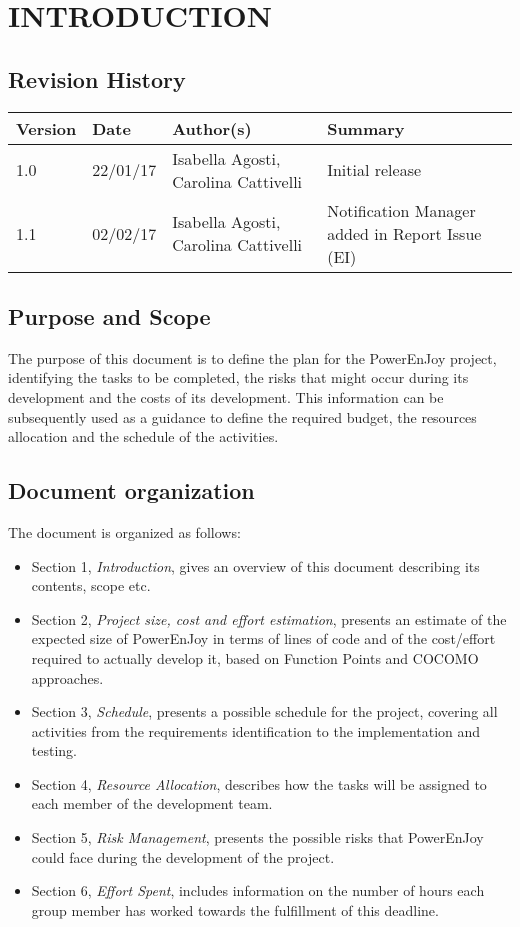 \section{INTRODUCTION}

\subsection{Revision History}
\begin{table}[h]
	\centering
	\begin{tabular}{| m{1.5cm} | m{1.6cm} | m{5cm} | m{3.9cm} |}
		\hline
		\textbf{Version} & \textbf{Date} & \textbf{Author(s)} & \textbf{Summary}\\
		\hline
		1.0 & 22/01/17 & Isabella Agosti, Carolina Cattivelli & Initial release\\
		\hline
		1.1 & 02/02/17 & Isabella Agosti, Carolina Cattivelli & Notification Manager added in Report Issue (EI)\\
		\hline
	\end{tabular}
\end{table}

\subsection{Purpose and Scope}
The purpose of this document is to define the plan for the PowerEnJoy project, identifying the tasks to be completed, the risks that might occur during its development and the costs of its development. This information can be subsequently used as a guidance to define the required budget, the resources allocation and the schedule of the activities.

\subsection{Document organization}
The document is organized as follows:
\begin{itemize}
	\item Section 1, \textit{Introduction}, gives an overview of this document describing its contents, scope etc.
	\item Section 2, \textit{Project size, cost and effort estimation}, presents an estimate of the expected size of PowerEnJoy in terms of lines of code and of the cost/effort required to actually develop it, based on Function Points and COCOMO approaches.
	\item Section 3, \textit{Schedule}, presents a possible schedule for the project, covering all activities from the requirements identification to the implementation and testing.
	\item Section 4, \textit{Resource Allocation}, describes how the tasks will be assigned to each member of the development team.
	\item Section 5, \textit{Risk Management}, presents the possible risks that PowerEnJoy could face during the development of the project.
	\item Section 6, \textit{Effort Spent}, includes information on the number of hours each group member has worked towards the fulfillment of this deadline. 
\end{itemize}

